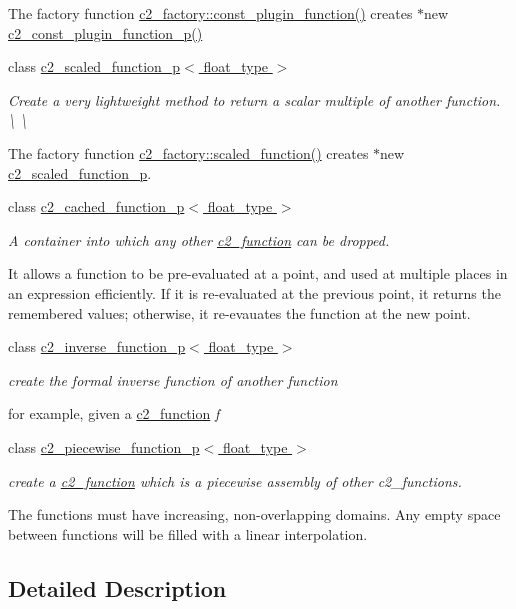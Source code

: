 \begin{DoxyCompactItemize}
\begin{DoxyCompactList}
The factory function \hyperlink{classc2__factory_aebeb20651a347e1fa8f14118faf2588e}{c2\+\_\+factory\+::const\+\_\+plugin\+\_\+function()} creates $\ast$new \hyperlink{classc2__const__plugin__function__p_a443dc7bcbdc6e458673b98aedf53ad56}{c2\+\_\+const\+\_\+plugin\+\_\+function\+\_\+p()} \end{DoxyCompactList}\item 
class \hyperlink{classc2__scaled__function__p}{c2\+\_\+scaled\+\_\+function\+\_\+p$<$ float\+\_\+type $>$}
\begin{DoxyCompactList}\small\item\em Create a very lightweight method to return a scalar multiple of another function. \textbackslash{} \textbackslash{}

The factory function \hyperlink{classc2__factory_a81a7b686b7ffa389ad4dcd8d18997332}{c2\+\_\+factory\+::scaled\+\_\+function()} creates $\ast$new \hyperlink{classc2__scaled__function__p}{c2\+\_\+scaled\+\_\+function\+\_\+p}. \end{DoxyCompactList}\item 
class \hyperlink{classc2__cached__function__p}{c2\+\_\+cached\+\_\+function\+\_\+p$<$ float\+\_\+type $>$}
\begin{DoxyCompactList}\small\item\em A container into which any other \hyperlink{classc2__function}{c2\+\_\+function} can be dropped.

It allows a function to be pre-\/evaluated at a point, and used at multiple places in an expression efficiently. If it is re-\/evaluated at the previous point, it returns the remembered values; otherwise, it re-\/evauates the function at the new point. \end{DoxyCompactList}\item 
class \hyperlink{classc2__inverse__function__p}{c2\+\_\+inverse\+\_\+function\+\_\+p$<$ float\+\_\+type $>$}
\begin{DoxyCompactList}\small\item\em create the formal inverse function of another function

for example, given a \hyperlink{classc2__function}{c2\+\_\+function} {\itshape f} \end{DoxyCompactList}\item 
class \hyperlink{classc2__piecewise__function__p}{c2\+\_\+piecewise\+\_\+function\+\_\+p$<$ float\+\_\+type $>$}
\begin{DoxyCompactList}\small\item\em create a \hyperlink{classc2__function}{c2\+\_\+function} which is a piecewise assembly of other c2\+\_\+functions.

The functions must have increasing, non-\/overlapping domains. Any empty space between functions will be filled with a linear interpolation. \end{DoxyCompactList}\end{DoxyCompactItemize}


\subsection{Detailed Description}
